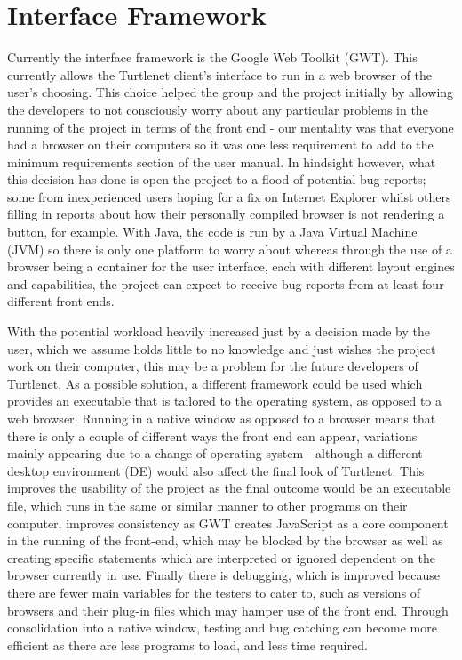 \section{Interface Framework}
Currently the interface framework is the Google Web Toolkit (GWT).  This
currently allows the Turtlenet client's interface to run in a web browser of the
user's choosing.  This choice helped the group and the project initially by 
allowing the developers to not consciously worry about any particular problems
in the running of the project in terms of the front end - our mentality was that
everyone had a browser on their computers so it was one less requirement to add
to the minimum requirements section of the user manual.  In hindsight however,
what this decision has done is open the project to a flood of potential bug
reports; some from inexperienced users hoping for a fix on Internet Explorer
whilst others filling in reports about how their personally compiled browser is
not rendering a button, for example.  With Java, the code is run by a Java
Virtual Machine (JVM) so there is only one platform to worry about whereas
through the use of a browser being a container for the user interface, each with
different layout engines and capabilities, the project can expect to receive bug
reports from at least four different front ends.

With the potential workload heavily increased just by a decision made by the
user, which we assume holds little to no knowledge and just wishes the project
work on their computer, this may be a problem for the future developers of
Turtlenet.  As a possible solution, a different framework could be used which
provides an executable that is tailored to the operating system, as opposed to
a web browser.  Running in a native window as opposed to a browser means that
there is only a couple of different ways the front end can appear, variations
mainly appearing due to a change of operating system - although a different
desktop environment (DE) would also affect the final look of Turtlenet.  This
improves the usability of the project as the final outcome would be an
executable file, which runs in the same or similar manner to other programs on
their computer, improves consistency as GWT creates JavaScript as a core 
component in the running of the front-end, which may be blocked by the browser
as well as creating specific statements which are interpreted or ignored
dependent on the browser currently in use.  Finally there is debugging, which
is improved because there are fewer main variables for the testers to cater to,
such as versions of browsers and their plug-in files which may hamper use of the
front end.  Through consolidation into a native window, testing and bug catching
can become more efficient as there are less programs to load, and less time
required.

